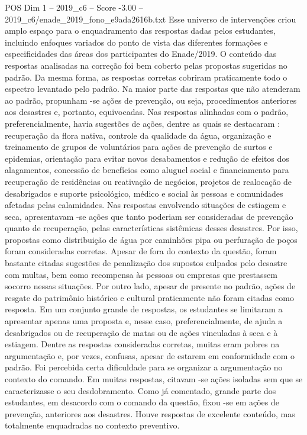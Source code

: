 \begin{textsample}{POS Dim 1 – 2019\_c6 – Score -3.00 – 2019\_c6/enade\_2019\_fono\_e9ada2616b.txt}
Esse universo de intervenções criou amplo espaço para o enquadramento das respostas dadas pelos estudantes, incluindo enfoques variados do ponto de vista das diferentes formações e especificidades das áreas dos participantes do Enade/2019.
O conteúdo das respostas analisadas na correção foi bem coberto pelas propostas sugeridas no padrão.
Da mesma forma, as respostas corretas cobriram praticamente todo o espectro levantado pelo padrão.
Na maior parte das respostas que não atenderam ao padrão, propunham -se ações de prevenção, ou seja, procedimentos anteriores aos desastres e, portanto, equivocadas.
Nas respostas alinhadas com o padrão, preferencialmente, havia sugestões de ações, dentre as quais se destacaram : recuperação da flora nativa, controle da qualidade da água, organização e treinamento de grupos de voluntários para ações de prevenção de surtos e epidemias, orientação para evitar novos desabamentos e redução de efeitos dos alagamentos, concessão de benefícios como aluguel social e financiamento para recuperação de residências ou reativação de negócios, projetos de realocação de desabrigados e suporte psicológico, médico e social às pessoas e comunidades afetadas pelas calamidades.
Nas respostas envolvendo situações de estiagem e seca, apresentavam -se ações que tanto poderiam ser consideradas de prevenção quanto de recuperação, pelas características sistêmicas desses desastres.
Por isso, propostas como distribuição de água por caminhões pipa ou perfuração de poços foram consideradas corretas.
Apesar de fora do contexto da questão, foram bastante citadas sugestões de penalização dos supostos culpados pelo desastre com multas, bem como recompensa às pessoas ou empresas que prestassem socorro nessas situações.
Por outro lado, apesar de presente no padrão, ações de resgate do patrimônio histórico e cultural praticamente não foram citadas como resposta.
Em um conjunto grande de respostas, os estudantes se limitaram a apresentar apenas uma proposta e, nesse caso, preferencialmente, de ajuda a desabrigados ou de recuperação de matas ou de ações vinculadas à seca e à estiagem.
Dentre as respostas consideradas corretas, muitas eram pobres na argumentação e, por vezes, confusas, apesar de estarem em conformidade com o padrão.
Foi percebida certa dificuldade para se organizar a argumentação no contexto do comando.
Em muitas respostas, citavam -se ações isoladas sem que se caracterizasse o seu desdobramento.
Como já comentado, grande parte dos estudantes, em desacordo com o comando da questão, fixou -se em ações de prevenção, anteriores aos desastres.
Houve respostas de excelente conteúdo, mas totalmente enquadradas no contexto preventivo.

\end{textsample}
